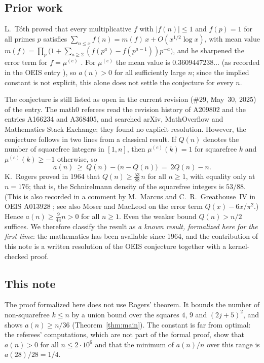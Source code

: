 \documentclass[11pt]{amsart}
\theoremstyle{plain}
\theoremstyle{definition}
\newcommand{\mue}{\mu^{(e)}}
\begin{document}
\subsection*{Prior work}
L.~T\'oth \cite[Theorem~1]{Toth} proved that every multiplicative $f$ with $|f(n)|\le1$ and $f(p)=1$ for all primes $p$ satisfies $\sum_{n\le x}f(n)=m(f)\,x+O(x^{1/2}\log x)$, with mean value $m(f)=\prod_p\bigl(1+\sum_{a\ge2}(f(p^a)-f(p^{a-1}))p^{-a}\bigr)$, and he sharpened the error term for $f=\mue$ \cite[Theorem~2]{Toth}. For $\mue$ the mean value is $0.3609447238\ldots$ (as recorded in the OEIS entry \cite{A209802}), so $a(n)>0$ for all sufficiently large $n$; since the implied constant is not explicit, this alone does not settle the conjecture for every $n$.

The conjecture is still listed as open in the current revision (\#29, May~30, 2025) of the entry. The math0 referees read the revision history of A209802 and the entries A166234 and A368405, and searched arXiv, MathOverflow and Mathematics Stack Exchange; they found no explicit resolution. However, the conjecture follows in two lines from a classical result. If $Q(n)$ denotes the number of squarefree integers in $[1,n]$, then $\mue(k)=1$ for squarefree $k$ and $\mue(k)\ge-1$ otherwise, so
\[
  a(n)\ \ge\ Q(n)-\bigl(n-Q(n)\bigr)\ =\ 2Q(n)-n .
\]
K.~Rogers \cite{Rogers} proved in 1964 that $Q(n)\ge \tfrac{53}{88}\,n$ for all $n\ge1$, with equality only at $n=176$; that is, the Schnirelmann density of the squarefree integers is $53/88$. (This is also recorded in a comment by M.~Marcus and C.~R.~Greathouse~IV in OEIS A013928 \cite{A013928}; see also Moser and MacLeod \cite{MM} on the error term $Q(x)-6x/\pi^2$.) Hence $a(n)\ge\tfrac{9}{44}n>0$ for all $n\ge1$. Even the weaker bound $Q(n)>n/2$ suffices. We therefore classify the result as \emph{a known result, formalized here for the first time}: the mathematics has been available since 1964, and the contribution of this note is a written resolution of the OEIS conjecture together with a kernel-checked proof.

\subsection*{This note}
The proof formalized here does not use Rogers' theorem. It bounds the number of non-squarefree $k\le n$ by a union bound over the squares $4$, $9$ and $(2j+5)^2$, and shows $a(n)\ge n/36$ (Theorem~\ref{thm:main}). The constant is far from optimal: the referees' computations, which are not part of the formal proof, show that $a(n)>0$ for all $n\le 2\cdot10^6$ and that the minimum of $a(n)/n$ over this range is $a(28)/28=1/4$.
\end{document}
